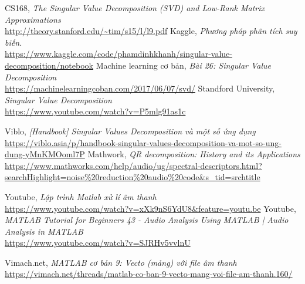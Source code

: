 \begin{thebibliography}{99}
\bibitem{} CS168, {\it The Singular Value Decomposition (SVD)
		and Low-Rank Matrix Approximations}\\ \url{http://theory.stanford.edu/~tim/s15/l/l9.pdf}
\bibitem{} Kaggle, {\it Phương pháp phân tích suy biến.}\\ \url{https://www.kaggle.com/code/phamdinhkhanh/singular-value-decomposition/notebook}
\bibitem{} Machine learning cơ bản, {\it Bài 26: Singular Value Decomposition}\\ \url{https://machinelearningcoban.com/2017/06/07/svd/}
\bibitem{} Standford University, {\it Singular Value Decomposition}\\ \url{https://www.youtube.com/watch?v=P5mlg91as1c}


\bibitem{} Viblo, {\it [Handbook] Singular Values Decomposition và một số ứng dụng}\\ \url{https://viblo.asia/p/handbook-singular-values-decomposition-va-mot-so-ung-dung-yMnKMOoml7P}
\bibitem{} Mathwork, {\it QR decomposition: History and its
	Applications}\\ \url{https://www.mathworks.com/help/audio/ug/spectral-descriptors.html?searchHighlight=noise%20reduction%20audio%20code&s_tid=srchtitle}

\bibitem{} Youtube, {\it Lập trình Matlab xử lí âm thanh}\\ \url{https://www.youtube.com/watch?v=xXk9nS6YdU8&feature=youtu.be}
\bibitem{} Youtube, {\it MATLAB Tutorial for Beginners 43 - Audio Analysis Using MATLAB | Audio Analysis in MATLAB}\\ \url{https://www.youtube.com/watch?v=SJRHv5vvlnU}

\bibitem{} Vimach.net, {\it MATLAB cơ bản 9: Vecto (mảng) với file âm thanh}\\ \url{https://vimach.net/threads/matlab-co-ban-9-vecto-mang-voi-file-am-thanh.160/}

\end{thebibliography}
